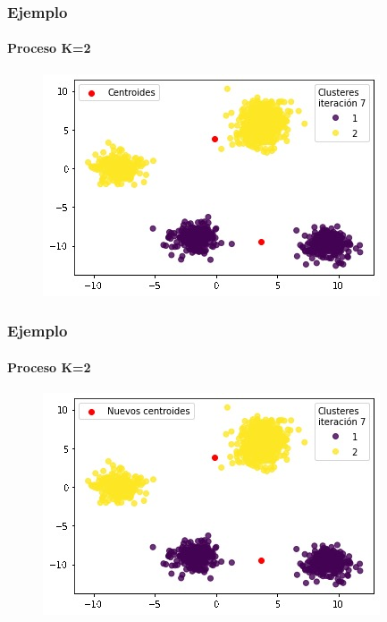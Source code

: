 \documentclass[
  shownotes,
  xcolor={svgnames},
  hyperref={colorlinks,citecolor=DarkBlue,linkcolor=DarkRed,urlcolor=DarkBlue}
  , aspectratio=169]{beamer}
\begin{document}
\begin{frame}
\frametitle{Ejemplo}
\framesubtitle{Proceso K=2}


\begin{figure}[H] \centering

    \centering
    \includegraphics[scale=.7]{figures/k2_11.jpg}
  \\
  \tiny
\end{figure}


\end{frame}
\begin{frame}
\frametitle{Ejemplo}
\framesubtitle{Proceso K=2}


\begin{figure}[H] \centering

    \centering
    \includegraphics[scale=.7]{figures/k2_12.jpg}
  \\
  \tiny
\end{figure}


\end{frame}
\end{document}
